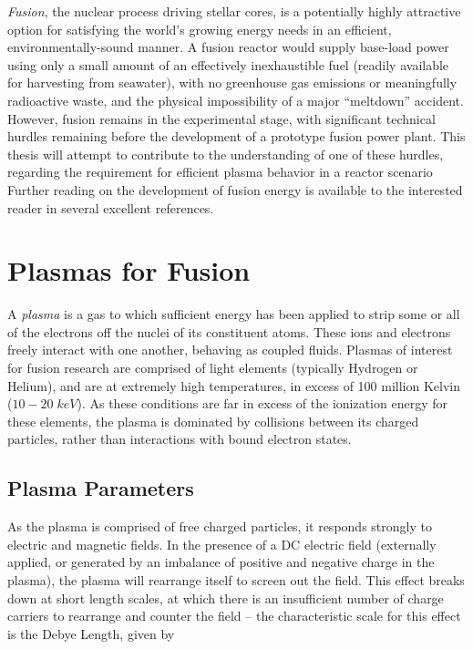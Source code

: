\emph{Fusion}, the nuclear process driving stellar cores, is a potentially highly attractive option for satisfying the world's growing energy needs in an efficient, environmentally-sound manner.  A fusion reactor would supply base-load power using only a small amount of an effectively inexhaustible fuel (readily available for harvesting from seawater), with no greenhouse gas emissions or meaningfully radioactive waste, and the physical impossibility of a major ``meltdown'' accident.  However, fusion remains in the experimental stage, with significant technical hurdles remaining before the development of a prototype fusion power plant.  This thesis will attempt to contribute to the understanding of one of these hurdles, regarding the requirement for efficient plasma behavior in a reactor scenario   Further reading on the development of fusion energy is available to the interested reader in several excellent references. \cite{Freidberg2007,Wesson2011,Chen1984} \nicesectionending
{}


\section{Plasmas for Fusion}\label{sec:intro_plasmas}

A \emph{plasma} is a gas to which sufficient energy has been applied to strip some or all of the electrons off the nuclei of its constituent atoms.  These ions and electrons freely interact with one another, behaving as coupled fluids.  Plasmas of interest for fusion research are comprised of light elements (typically Hydrogen or Helium), and are at extremely high temperatures, in excess of 100 million Kelvin ($10-20 \;\si{keV}$).  As these conditions are far in excess of the ionization energy for these elements, the plasma is dominated by collisions between its charged particles, rather than interactions with bound electron states.

\subsection{Plasma Parameters}\label{subsec:intro_params}

As the plasma is comprised of free charged particles, it responds strongly to electric and magnetic fields.  In the presence of a DC electric field (externally applied, or generated by an imbalance of positive and negative charge in the plasma), the plasma will rearrange itself to screen out the field.  This effect breaks down at short length scales, at which there is an insufficient number of charge carriers to rearrange and counter the field -- the characteristic scale for this effect is the Debye Length, given by

